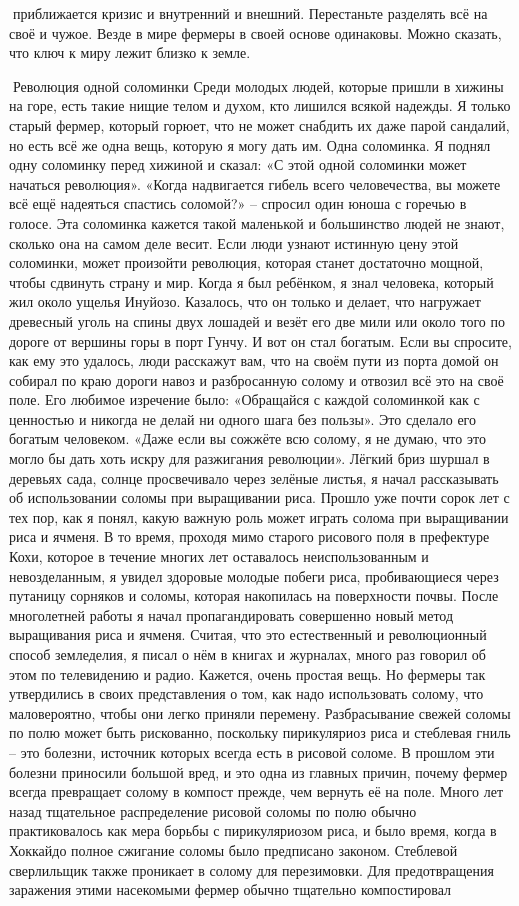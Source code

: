 \documentclass[a4paper]{book}
\begin{document}
приближается кризис и внутренний и внешний.
Перестаньте разделять всё на своё и чужое. Везде в мире фермеры в своей основе
одинаковы. Можно сказать, что ключ к миру лежит близко к земле.

Революция одной соломинки
Среди молодых людей, которые пришли в хижины на горе, есть такие нищие телом и
духом, кто лишился всякой надежды. Я только старый фермер, который горюет, что не может
снабдить их даже парой сандалий, но есть всё же одна вещь, которую я могу дать им.
Одна соломинка.
Я поднял одну соломинку перед хижиной и сказал: «С этой одной соломинки может
начаться революция».
«Когда надвигается гибель всего человечества, вы можете всё ещё надеяться спастись
соломой?» – спросил один юноша с горечью в голосе.
Эта соломинка кажется такой маленькой и большинство людей не знают, сколько она на
самом деле весит. Если люди узнают истинную цену этой соломинки, может произойти
революция, которая станет достаточно мощной, чтобы сдвинуть страну и мир.
Когда я был ребёнком, я знал человека, который жил около ущелья Инуйозо. Казалось,
что он только и делает, что нагружает древесный уголь на спины двух лошадей и везёт его
две мили или около того по дороге от вершины горы в порт Гунчу. И вот он стал богатым.
Если вы спросите, как ему это удалось, люди расскажут вам, что на своём пути из порта
домой он собирал по краю дороги навоз и разбросанную солому и отвозил всё это на своё
поле. Его любимое изречение было:
«Обращайся с каждой соломинкой как с ценностью и никогда не делай ни одного шага
без пользы». Это сделало его богатым человеком.
«Даже если вы сожжёте всю солому, я не думаю, что это могло бы дать хоть искру для
разжигания революции».
Лёгкий бриз шуршал в деревьях сада, солнце просвечивало через зелёные листья, я
начал рассказывать об использовании соломы при выращивании риса.
Прошло уже почти сорок лет с тех пор, как я понял, какую важную роль может играть
солома при выращивании риса и ячменя. В то время, проходя мимо старого рисового поля в
префектуре Кохи, которое в течение многих лет оставалось неиспользованным и
невозделанным, я увидел здоровые молодые побеги риса, пробивающиеся через путаницу
сорняков и соломы, которая накопилась на поверхности почвы. После многолетней работы я
начал пропагандировать совершенно новый метод выращивания риса и ячменя.
Считая, что это естественный и революционный способ земледелия, я писал о нём в
книгах и журналах, много раз говорил об этом по телевидению и радио. Кажется, очень
простая вещь. Но фермеры так утвердились в своих представления о том, как надо
использовать солому, что маловероятно, чтобы они легко приняли перемену. Разбрасывание
свежей соломы по полю может быть рискованно, поскольку пирикуляриоз риса и стеблевая
гниль – это болезни, источник которых всегда есть в рисовой соломе. В прошлом эти
болезни приносили большой вред, и это одна из главных причин, почему фермер всегда
превращает солому в компост прежде, чем вернуть её на поле. Много лет назад тщательное
распределение рисовой соломы по полю обычно практиковалось как мера борьбы с
пирикуляриозом риса, и было время, когда в Хоккайдо полное сжигание соломы было
предписано законом.
Стеблевой сверлильщик также проникает в солому для перезимовки. Для
предотвращения заражения этими насекомыми фермер обычно тщательно компостировал
\end{document}
